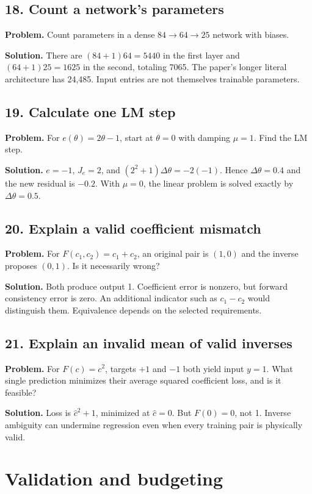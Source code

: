 \subsection*{18. Count a network's parameters}
\textbf{Problem.} Count parameters in a dense $84\to64\to25$ network
with biases.

\textbf{Solution.}
There are $(84+1)64=5440$ in the first layer and
$(64+1)25=1625$ in the second, totaling 7065.
The paper's longer literal architecture has 24,485.
Input entries are not themselves trainable parameters.

\subsection*{19. Calculate one LM step}
\textbf{Problem.} For $e(\theta)=2\theta-1$, start at $\theta=0$
with damping $\mu=1$. Find the LM step.

\textbf{Solution.}
$e=-1$, $J_e=2$, and
$(2^2+1)\Delta\theta=-2(-1)$.
Hence $\Delta\theta=0.4$ and the new residual is $-0.2$.
With $\mu=0$, the linear problem is solved exactly by $\Delta\theta=0.5$.

\subsection*{20. Explain a valid coefficient mismatch}
\textbf{Problem.} For $F(c_1,c_2)=c_1+c_2$, an original pair is
$(1,0)$ and the inverse proposes $(0,1)$. Is it necessarily wrong?

\textbf{Solution.}
Both produce output 1. Coefficient error is nonzero, but forward
consistency error is zero. An additional indicator such as $c_1-c_2$
would distinguish them. Equivalence depends on the selected requirements.

\subsection*{21. Explain an invalid mean of valid inverses}
\textbf{Problem.} For $F(c)=c^2$, targets $+1$ and $-1$ both yield
input $y=1$. What single prediction minimizes their average squared
coefficient loss, and is it feasible?

\textbf{Solution.}
Loss is $\hat c^2+1$, minimized at $\hat c=0$.
But $F(0)=0$, not 1. Inverse ambiguity can undermine regression even
when every training pair is physically valid.

\section{Validation and budgeting}
